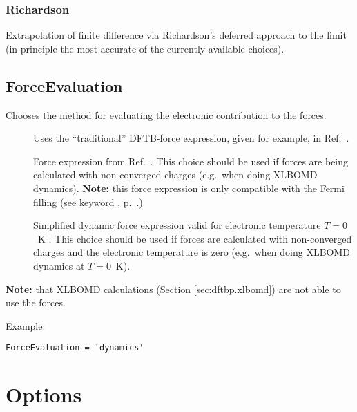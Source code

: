\subsubsection{Richardson\cb}
\label{sec:dftbp.Richardson}

Extrapolation of finite difference via Richardson's deferred approach to the
limit (in principle the most accurate of the currently available choices).

\subsection{ForceEvaluation}
\label{sec:dftbp.ForceEvaluation}

Chooses the method for evaluating the electronic contribution to the
forces.

\begin{description}
\item[] Uses the ``traditional'' DFTB-force expression, given
  for example, in Ref.~\cite{elstner-prb-58-7260}.
\item[] Force expression from
  Ref.~\cite{aradi-jctc-11-3357}. This choice should be used if forces are being
  calculated with non-converged charges (e.g.\ when doing XLBOMD
  dynamics). \textbf{Note:} this force expression is only compatible with the
  Fermi filling (see keyword , p.~.)
\item [] Simplified dynamic force expression valid for
  electronic temperature \mbox{$T=0$~K} \cite{aradi-jctc-11-3357}.  This choice
  should be used if forces are calculated with non-converged charges and the
  electronic temperature is zero (e.g.\ when doing XLBOMD dynamics at
  \mbox{$T=0$~K}).
\end{description}

\textbf{Note:} that XLBOMD calculations (Section \ref{sec:dftbp.xlbomd}) are not
able to use the  forces.

Example:
\begin{verbatim}
ForceEvaluation = 'dynamics'
\end{verbatim}


\section{Options}
\label{sec:dftbp.Options}


